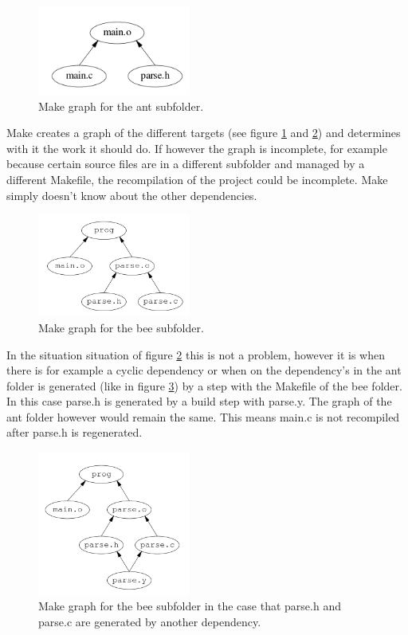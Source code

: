 \begin{figure}
  \centering
  \includegraphics[width=5cm]{Images/makerec-graph-main.png}
  \caption{ Make graph for the ant subfolder. }
  \label{fig:recmake_graph-main}
\end{figure}

Make creates a graph of the different targets (see figure \ref{fig:recmake_graph-main} and \ref{fig:recmake_graph-bee}) and determines with it the work it should do. If however the graph is incomplete, for example because certain source files are in a different subfolder and managed by a different Makefile, the recompilation of the project could be incomplete. Make simply doesn't know about the other dependencies.


\begin{figure}[H]
  \centering
  \includegraphics[width=5cm]{Images/makerec-bee-graph.png}
  \caption{ Make graph for the bee subfolder. }
  \label{fig:recmake_graph-bee}
\end{figure}

In the situation situation of figure \ref{fig:recmake_graph-bee} this is not a problem, however it is when there is for example a cyclic dependency or when on the dependency's in the ant folder is generated (like in figure \ref{fig:recmake_graph-bee2}) by a step with the Makefile of the bee folder. In this case parse.h is generated by a build step with parse.y. The graph of the ant folder however would remain the same. This means main.c is not recompiled after parse.h is regenerated. 

\begin{figure}
  \centering
  \includegraphics[width=5cm]{Images/makerec-bee2-graph.png}
  \caption{ Make graph for the bee subfolder in the case that parse.h and parse.c are generated by another dependency. }
  \label{fig:recmake_graph-bee2}
\end{figure}